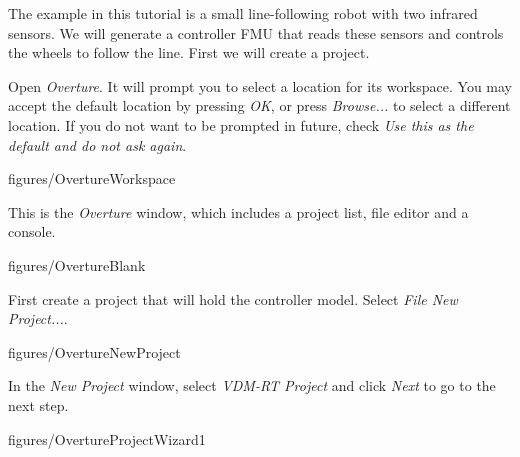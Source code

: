 \documentclass[11pt,a4paper]{../tutorial}
\begin{document}
The example in this tutorial is a small line-following robot with two infrared sensors. We will generate a controller FMU that reads these sensors and controls the wheels to follow the line. First we will create a project.

\begin{instructions}
\item Open \emph{Overture}. It will prompt you to select a location for its workspace. You may accept the default location by pressing \emph{OK}, or press \emph{Browse...} to select a different location. If you do not want to be prompted in future, check \emph{Use this as the default and do not ask again}.

    \begin{annotation}[width=0.7\linewidth]{figures/OvertureWorkspace}
    \end{annotation}

    \newpage
    This is the \emph{Overture} window, which includes a project list, file editor and a console.

    \begin{annotation}[width=\linewidth]{figures/OvertureBlank}
    \end{annotation}

\item First create a project that will hold the controller model. Select \emph{File \menusep New \menusep Project...}.

    \begin{annotation}[width=\linewidth,trim=0 250 0 0,clip]{figures/OvertureNewProject}
    \end{annotation}

\newpage
\item In the \emph{New Project} window, select \emph{VDM-RT Project} and click \emph{Next \menusep} to go to the next step.

    \begin{annotation}[width=0.6\linewidth]{figures/OvertureProjectWizard1}
    \end{annotation}


\end{instructions}
\end{document}
